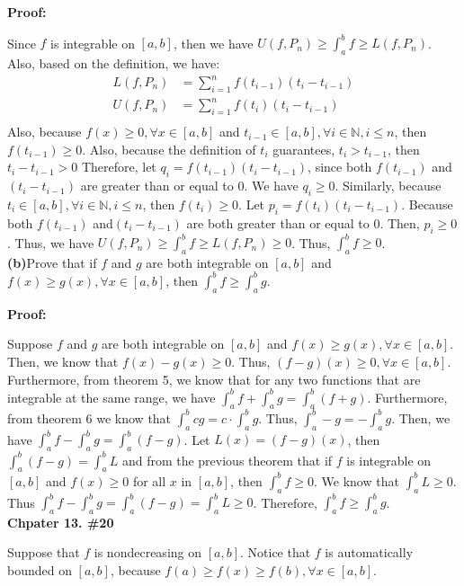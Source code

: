 \documentclass[a4paper,12pt]{report}
\begin{document}
\noindent
\textbf{Proof: }

\noindent
Since $f$ is integrable on $[a,b]$, then we have $U(f,P_n)\geq \int_{a}^{b}f \geq L(f,P_n)$. Also, based on the definition, we have:
\begin{align*}
L(f,P_n)&=\sum_{i=1}^{n}f(t_{i-1})(t_i-t_{i-1})\\
U(f,P_n)&=\sum_{i=1}^{n}f(t_{i})(t_i-t_{i-1})\\
\end{align*}
Also, because $f(x)\geq 0, \forall x\in [a,b]$ and $t_{i-1}\in[a,b], \forall i\in \mathbb{N}, i\leq n$, then $f(t_{i-1})\geq 0$. Also, because the definition of $t_i$ guarantees, $t_i>t_{i-1}$, then $t_i-t_{i-1}>0$ Therefore, let $q_i=f(t_{i-1})(t_i-t_{i-1})$, since both $f(t_{i-1})$ and$(t_i-t_{i-1})$ are greater than or equal to $0$. We have $q_i\geq 0$. Similarly, because $t_i\in [a,b], \forall i\in \mathbb{N}, i\leq n$, then $f(t_i)\geq 0$. Let $p_i=f(t_{i})(t_i-t_{i-1})$. Because both $f(t_{i-1})$ and$(t_i-t_{i-1})$ are both greater than or equal to $0$. Then, $p_i\geq 0$. Thus, we have $U(f,P_n)\geq \int_{a}^{b}f \geq L(f,P_n)\geq 0$. Thus, $\int_{a}^{b}f \geq 0$.\\

\noindent
\textbf{(b)}Prove that if $f$ and $g$ are both integrable on $[a,b]$ and $f(x)\geq g(x), \forall x\in [a,b]$, then $\int_{a}^{b}f\geq \int_{a}^{b}g$. 

\noindent
\textbf{Proof:}

\noindent
Suppose $f$ and $g$ are both integrable on $[a,b]$ and $f(x)\geq g(x), \forall x\in [a,b]$. Then, we know that $f(x)-g(x)\geq 0$. Thus, $(f-g)(x)\geq 0, \forall x\in [a,b]$. Furthermore, from theorem 5, we know that for any two functions that are integrable at the same range, we have $\int_{a}^{b}f+\int_{a}^{b}g=\int_{a}^{b}(f+g)$. Furthermore, from theorem 6 we know that $\int_{a}^{b}cg=c\cdot{\int_{a}^{b}g}$. Thus, $\int_{a}^{b}-g=-\int_{a}^{b}g$. Then, we have $\int_{a}^{b}f-\int_{a}^{b}g=\int_{a}^{b}(f-g)$. Let $L(x)=(f-g)(x)$, then $\int_{a}^{b}(f-g)=\int_{a}^{b}L$ and from the previous theorem that if $f$ is integrable on $[a,b]$ and $f(x)\geq 0$ for all $x$ in $[a,b]$, then $\int_{a}^{b}f\geq 0$. We know that $\int_{a}^{b}L\geq 0$. Thus $\int_{a}^{b}f-\int_{a}^{b}g=\int_{a}^{b}(f-g)=\int_{a}^{b}L\geq 0$. Therefore, $\int_{a}^{b}f\geq \int_{a}^{b}g$.\\

\noindent
\textbf{Chpater 13. \#20}

\noindent
Suppose that $f$ is nondecreasing on $[a,b]$. Notice that $f$ is automatically bounded on $[a,b]$, because $f(a)\geq f(x)\geq f(b), \forall x\in [a,b]$.
\end{document}
